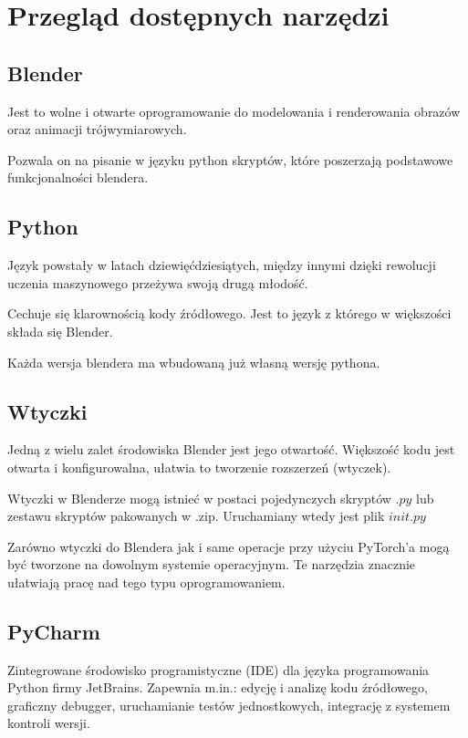 \documentclass[brudnopis]{xmgr}
\begin{document}
\chapter{Przegląd dostępnych narzędzi}

\section{Blender\label{s:dsssl}}

Jest to wolne i otwarte oprogramowanie do modelowania i renderowania obrazów oraz animacji trójwymiarowych.

Pozwala on na pisanie w języku python skryptów, które poszerzają podstawowe funkcjonalności blendera.

\section{Python\label{s:dsssl}}

Język powstały w latach dziewięćdziesiątych, między innymi dzięki rewolucji uczenia maszynowego przeżywa swoją drugą młodość.

Cechuje się klarownością kody źródłowego.
Jest to język z którego w większości składa się Blender.

Każda wersja blendera ma wbudowaną już własną wersję pythona. 

\section{Wtyczki\label{s:dsssl}}

Jedną z wielu zalet środowiska Blender jest jego otwartość. Większość kodu jest otwarta i konfigurowalna, ułatwia to tworzenie rozszerzeń (wtyczek).



Wtyczki w Blenderze mogą istnieć w postaci pojedynczych skryptów 
$.py$ lub zestawu skryptów pakowanych w .zip. Uruchamiany wtedy jest plik $init.py$

Zarówno wtyczki do Blendera jak i same operacje przy użyciu PyTorch’a mogą być tworzone na dowolnym systemie operacyjnym. Te narzędzia znacznie ułatwiają pracę nad tego typu oprogramowaniem.

\section{PyCharm\label{s:dsssl}}
 Zintegrowane środowisko programistyczne (IDE) dla języka programowania Python firmy JetBrains. Zapewnia m.in.: edycję i analizę kodu źródłowego, graficzny debugger, uruchamianie testów jednostkowych, integrację z systemem kontroli wersji.
 
\end{document}
